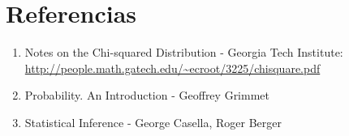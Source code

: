 \documentclass[a4paper, 10pt]{article} %
\begin{document}
\section{Referencias}
\begin{enumerate}
  \item Notes on the Chi-squared Distribution - Georgia Tech Institute: \url{http://people.math.gatech.edu/~ecroot/3225/chisquare.pdf}
  \item Probability. An Introduction - Geoffrey Grimmet
  \item Statistical Inference - George Casella, Roger Berger
\end{enumerate}
\end{document}
